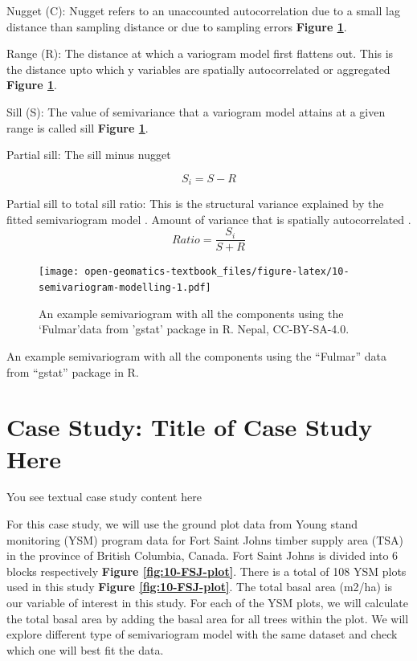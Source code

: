 \documentclass[
]{book}
\begin{document}
Nugget (C): Nugget refers to an unaccounted autocorrelation due to a small lag distance than sampling distance or due to sampling errors \textbf{Figure \ref{fig:10-semivariogram-modelling}}.

Range (R): The distance at which a variogram model first flattens out. This is the distance upto which y variables are spatially autocorrelated or aggregated \textbf{Figure \ref{fig:10-semivariogram-modelling}}.

Sill (S): The value of semivariance that a variogram model attains at a given range is called sill \textbf{Figure \ref{fig:10-semivariogram-modelling}}.

Partial sill: The sill minus nugget

\[S_{i}= S-R\]

Partial sill to total sill ratio: This is the structural variance explained by the fitted semivariogram model \citep{rossi_geostatistical_1992}. Amount of variance that is spatially autocorrelated \citep{rossi_geostatistical_1992}.
\[ Ratio =\frac {S_{i}}{S+R}\]

\begin{figure}
\centering
\texttt{[image: open-geomatics-textbook\_files/figure-latex/10-semivariogram-modelling-1.pdf]}
\caption{\label{fig:10-semivariogram-modelling}An example semivariogram with all the components using the `Fulmar'data from 'gstat' package in R. Nepal, CC-BY-SA-4.0.}
\end{figure}

An example semivariogram with all the components using the ``Fulmar'' \citep[see details][]{pebesma_mapping_2005} data from ``gstat'' package in R.

\hypertarget{case-study-title-of-case-study-here-1}{%
\section{Case Study: Title of Case Study Here}\label{case-study-title-of-case-study-here-1}}

You see textual case study content here

For this case study, we will use the ground plot data from Young stand monitoring (YSM) program data \citep{province_of_bc_provincial_2018} for Fort Saint Johns timber supply area (TSA) in the province of British Columbia, Canada. Fort Saint Johns is divided into 6 blocks respectively \textbf{Figure \ref{fig:10-FSJ-plot}}. There is a total of 108 YSM plots used in this study \textbf{Figure \ref{fig:10-FSJ-plot}}. The total basal area (m2/ha) is our variable of interest in this study. For each of the YSM plots, we will calculate the total basal area by adding the basal area for all trees within the plot. We will explore different type of semivariogram model with the same dataset and check which one will best fit the data.
\end{document}
